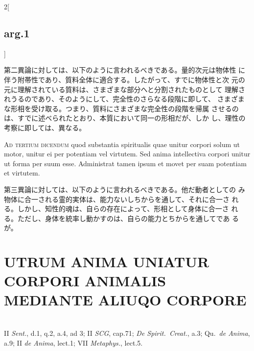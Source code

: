 \documentclass[paper=a4paper,fontsize=10pt,jafontsize=9pt,titlepage]{jlreq}
\begin{document}
\begin{paracol}{2}[\subsection{arg.1}]
\switchcolumn

 第二異論に対しては、以下のように言われるべきである。量的次元は物体性
 に伴う附帯性であり、質料全体に適合する。したがって、すでに物体性と次
 元の元に理解されている質料は、さまざまな部分へと分割されたものとして
 理解されうるのであり、そのようにして、完全性のさらなる段階に即して、
 さまざまな形相を受け取る。つまり、質料にさまざまな完全性の段階を帰属
 させるのは、すでに述べられたとおり、本質において同一の形相だが、しか
 し、理性の考察に即しては、異なる。
 
\switchcolumn*[\subsection{ad 3}]

{\scshape Ad tertium dicendum} quod substantia spiritualis quae unitur
corpori solum ut motor, unitur ei per potentiam vel virtutem. Sed
anima intellectiva corpori unitur ut forma per suum esse. Administrat
tamen ipsum et movet per suam potentiam et virtutem.

\switchcolumn

 第三異論に対しては、以下のように言われるべきである。他だ動者としての
 み物体に合一される霊的実体は、能力ないしちからを通して、それに合一さ
 れる。しかし、知性的魂は、自らの存在によって、形相として身体に合一さ
 れる。ただし、身体を統率し動かすのは、自らの能力とちからを通してであ
 るが。

\end{paracol}
\newpage



\section{UTRUM ANIMA UNIATUR CORPORI ANIMALIS MEDIANTE ALIUQO CORPORE}
\vspace{1em}
\\

{\footnotesize II {\itshape Sent.}, d.1, q.2, a.4, ad 3; II {\itshape SCG}, cap.71; {\itshape De Spirit.~Creat.}, a.3; Qu.~{\itshape de Anima}, a.9; II {\itshape de Anima}, lect.1; VII {\itshape Metaphys.}, lect.5.}
\end{document}
